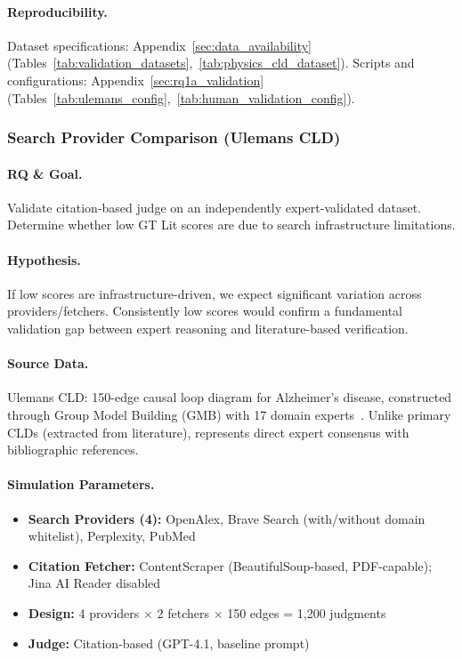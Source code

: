 \paragraph{Reproducibility.}
Dataset specifications: Appendix~\ref{sec:data_availability} (Tables~\ref{tab:validation_datasets},~\ref{tab:physics_cld_dataset}). Scripts and configurations: Appendix~\ref{sec:rq1a_validation} (Tables~\ref{tab:ulemans_config},~\ref{tab:human_validation_config}).

\subsubsection{Search Provider Comparison (Ulemans CLD)}
\label{sec:ulemans_validation}

\paragraph{RQ \& Goal.}
Validate citation-based judge on an independently expert-validated dataset. Determine whether low GT Lit scores are due to search infrastructure limitations.

\paragraph{Hypothesis.}
If low scores are infrastructure-driven, we expect significant variation across providers/fetchers. Consistently low scores would confirm a fundamental validation gap between expert reasoning and literature-based verification.

\paragraph{Source Data.}
Ulemans CLD: 150-edge causal loop diagram for Alzheimer's disease, constructed through Group Model Building (GMB) with 17 domain experts~\cite{uleman2024triangulation}. Unlike primary CLDs (extracted from literature), represents direct expert consensus with bibliographic references.

\paragraph{Simulation Parameters.}
\begin{itemize}[noitemsep]
    \item \textbf{Search Providers (4):} OpenAlex, Brave Search (with/without domain whitelist), Perplexity, PubMed
    \item \textbf{Citation Fetcher:} ContentScraper (BeautifulSoup-based, PDF-capable); Jina AI Reader disabled
    \item \textbf{Design:} 4 providers $\times$ 2 fetchers $\times$ 150 edges = 1,200 judgments
    \item \textbf{Judge:} Citation-based (GPT-4.1, baseline prompt)
\end{itemize}


